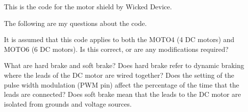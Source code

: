 This is the code for the motor shield by Wicked Device.

The following are my questions about the code.
\begin{DoxyItemize}
\item It is assumed that this code applies to both the M\+O\+T\+O4 (4 DC motors) and M\+O\+T\+O6 (6 DC motors). Is this correct, or are any modifications required?
\item What are hard brake and soft brake? Does hard brake refer to dynamic braking where the leads of the DC motor are wired together? Does the setting of the pulse width modulation (P\+WM pin) affect the percentage of the time that the leads are connected? Does soft brake mean that the leads to the DC motor are isolated from grounds and voltage sources. 
\end{DoxyItemize}